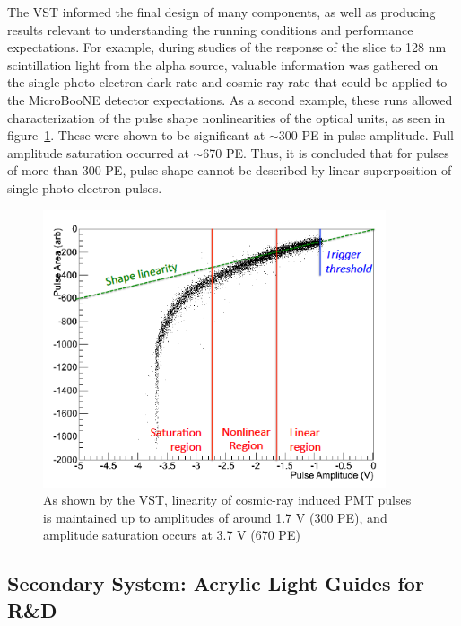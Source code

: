The VST informed the final design of many components, as well as producing results relevant to understanding the running conditions and performance expectations.   For example, during studies of the response of the slice to 128 nm scintillation light from the alpha source, 
valuable information was gathered on the single photo-electron dark rate and cosmic ray rate that could be applied to the MicroBooNE detector expectations.    As a second example, these runs allowed characterization of the pulse shape nonlinearities of the optical units, as seen in figure~\ref{fig:nonlinear}.  These were shown to be significant at $\sim$300 PE in pulse amplitude.  Full amplitude saturation occurred at $\sim$670 PE. Thus, it is concluded that for pulses of more than 300 PE, pulse shape cannot be described by linear superposition of single photo-electron pulses. 

\begin{figure}
\centering 
\includegraphics[width=0.9\textwidth]{./figures/nonlinear.png}
\caption{\footnotesize As shown by the VST, linearity of cosmic-ray induced PMT pulses is maintained up to amplitudes of around 1.7 V (300 PE), and amplitude saturation occurs at 3.7 V (670 PE) \cite{Jones:2015bya}
 \label{fig:nonlinear}  }
\end{figure}



\subsection{Secondary System: Acrylic Light Guides for R\&D}


